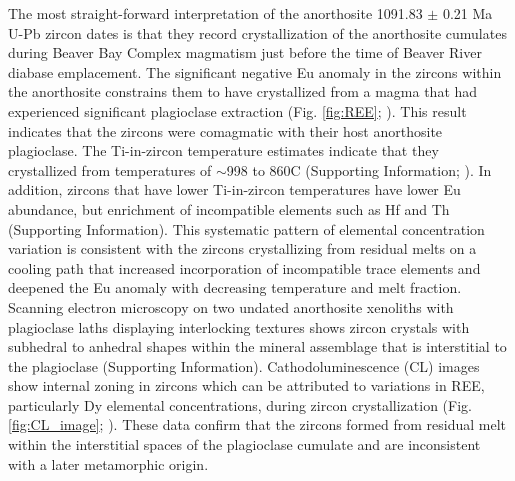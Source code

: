 The most straight-forward interpretation of the anorthosite 1091.83 $\pm$ 0.21 Ma U-Pb zircon dates is that they record crystallization of the anorthosite cumulates during Beaver Bay Complex magmatism just before the time of Beaver River diabase emplacement. The significant negative Eu anomaly in the zircons within the anorthosite constrains them to have crystallized from a magma that had experienced significant plagioclase extraction (Fig. \ref{fig:REE}; \citealp{Rubatto2002a, Schaltegger1999a}). This result indicates that the zircons were comagmatic with their host anorthosite plagioclase. The Ti-in-zircon temperature estimates indicate that they crystallized from temperatures of $\sim$998 to 860\textdegree C (Supporting Information; \citealp{Ferry2007a}). In addition, zircons that have lower Ti-in-zircon temperatures have lower Eu abundance, but enrichment of incompatible elements such as Hf and Th (Supporting Information). This systematic pattern of elemental concentration variation is consistent with the zircons crystallizing from residual melts on a cooling path that increased incorporation of incompatible trace elements and deepened the Eu anomaly with decreasing temperature and melt fraction. Scanning electron microscopy on two undated anorthosite xenoliths with plagioclase laths displaying interlocking textures shows zircon crystals with subhedral to anhedral shapes within the mineral assemblage that is interstitial to the plagioclase (Supporting Information). Cathodoluminescence (CL) images show internal zoning in zircons which can be attributed to variations in REE, particularly Dy elemental concentrations, during zircon crystallization (Fig. \ref{fig:CL_image}; \cite{Remond1992a}). These data confirm that the zircons formed from residual melt within the interstitial spaces of the plagioclase cumulate and are inconsistent with a later metamorphic origin.

